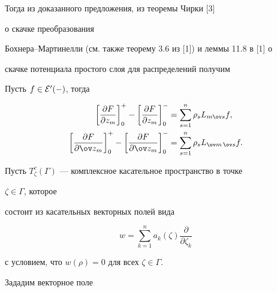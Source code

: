  


Тогда из доказанного предложения, из теоремы Чирки [3]


о скачке преобразования 


Бохнера--Мартинелли (см. также теорему 3.6 из [1]) и леммы 11.8 в [1] о 


скачке потенциала простого слоя для распределений получим 


 


\begin{cor} 


Пусть $f\in\cal E'(\Gamma)$, тогда 


\begin{equation} 


\begin{split} 


\bigg[\frac{\partial F}{\partial z_m}\bigg]^+_0- 


\bigg[\frac{\partial F}{\partial z_m}\bigg]^-_0&= 


\sum^n_{s=1}\rho_s L_{m\ov s}f, \\ 


% 


\bigg[\frac{\partial F}{\partial \ov z_m}\bigg]^+_0- 


\bigg[\frac{\partial F}{\partial \ov z_m}\bigg]^-_0&= 


\sum^n_{s=1}\rho_s L_{\ov m\,\ov s}f. 


\end{split} 


\end{equation} 


\end{cor} 


 


Пусть $T^c_\zeta(\Gamma)$ --- комплексное касательное пространство в точке 


$\zeta\in\Gamma$, которое 


состоит из касательных векторных полей вида 


$$ 


w=\sum^n_{k=1}a_k(\zeta) 


\frac{\partial }{\partial \zeta_k} 


$$ 


с условием, что $w(\rho)=0$ для всех $\zeta\in\Gamma$. 


 


Зададим векторное поле 


